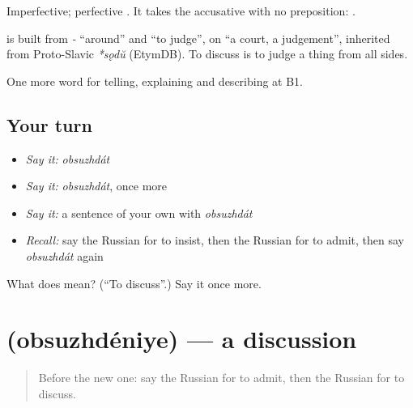 Imperfective; perfective \emph{}. It takes the accusative with no preposition: \emph{ }.

\begin{cousinweb}
\textbf{} is built from \emph{-} \textquotedblleft{}around\textquotedblright{} and \emph{} \textquotedblleft{}to judge\textquotedblright{}, on \emph{} \textquotedblleft{}a court, a judgement\textquotedblright{}, inherited from Proto-Slavic \emph{*sǫdŭ} (EtymDB). To discuss is to judge a thing from all sides.
\end{cousinweb}

\begin{grammarlens}[title={What you've built}]
One more word for telling, explaining and describing at B1.
\end{grammarlens}

\subsection*{Your turn}
\begin{itemize}
\raggedright
  \item \emph{Say it:} \emph{obsuzhdát}
  \item \emph{Say it:} \emph{obsuzhdát}, once more
  \item \emph{Say it:} a sentence of your own with \emph{obsuzhdát}
  \item \emph{Recall:} say the Russian for to insist, then the Russian for to admit, then say \emph{obsuzhdát} again
\end{itemize}

\begin{tcolorbox}[breakable,colback=teal!4,colframe=teal!35!black,title={Before you move on}]
What does  mean? (\textquotedblleft{}To discuss\textquotedblright{}.) Say it once more.
\end{tcolorbox}
\section[\texorpdfstring{\ru{обсуждение} (obsuzhdéniye)}{обсуждение (obsuzhdéniye)}]{ (obsuzhdéniye) — a discussion}

\label{lesson:RU-C342-obsuzhdenie}



\begin{quote}
Before the new one: say the Russian for to admit, then the Russian for to discuss.
\end{quote}

